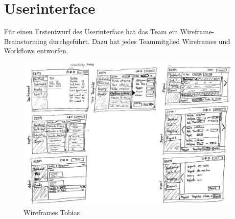 \section{Userinterface}

	Für einen Erstentwurf des Userinterface hat das Team ein Wireframe-Brainstorming durchgeführt.
	Dazu hat jedes Teammitglied Wireframes und Workflows entworfen.

	\begin{figure}[H]
		\includegraphics[width=\linewidth]{interfacesAndProtocols/media/img/wireframesTobias1.jpg}
		\centering
		\caption{Wireframes Tobias}
		\label{fig:wireframesTobias1}
	\end{figure}
	
